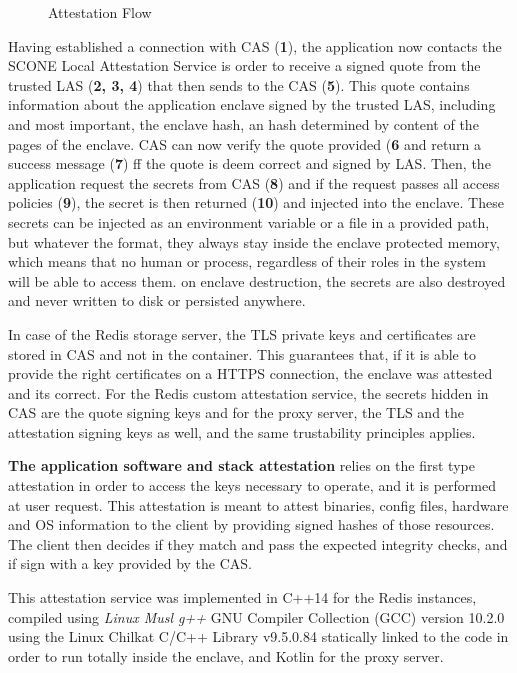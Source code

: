 \begin{figure}[htbp]
  \caption{Attestation Flow}
  \label{fig:attestation_flow}
\end{figure}

Having established a connection with \gls{CAS} (\textbf{1}), the application now contacts the SCONE Local Attestation Service is order to receive a signed quote from the trusted \gls{LAS} (\textbf{2, 3, 4}) that then sends to the \gls{CAS} (\textbf{5}). This quote contains information about the application enclave signed by the trusted \gls{LAS}, including and most important, the enclave hash, an hash determined by content of the pages of the enclave. \gls{CAS} can now verify the quote provided (\textbf{6} and return a success message (\textbf{7}) ff the quote is deem correct and signed by \gls{LAS}. Then, the application request the secrets from \gls{CAS} (\textbf{8}) and if the request passes all access policies (\textbf{9}), the secret is then returned (\textbf{10}) and injected into the enclave. These secrets can be injected as an environment variable or a file in a provided path, but whatever the format, they always stay inside the enclave protected memory, which means that no human or process, regardless of their roles in the system will be able to access them. on enclave destruction, the secrets are also destroyed and never written to disk or persisted anywhere. 

In case of the Redis storage server, the \gls{TLS} private keys and certificates are stored in \gls{CAS} and not in the container. This guarantees that, if it is able to provide the right certificates on a \gls{HTTPS} connection, the enclave was attested and its correct. For the Redis custom attestation service, the secrets hidden in \gls{CAS} are the quote signing keys and for the proxy server, the \gls{TLS} and the attestation signing keys as well, and the same trustability principles applies.

\textbf{The application software and stack attestation} relies on the first type attestation in order to access the keys necessary to operate, and it is performed at user request. This attestation is meant to attest binaries, config files, hardware and \gls{OS} information to the client by providing signed hashes of those resources. The client then decides if they match and pass the expected integrity checks, and if sign with a key provided by the \gls{CAS}.

This attestation service was implemented in C++14 for the Redis instances, compiled using \textit{Linux Musl g++} GNU Compiler Collection (GCC) version 10.2.0 using the Linux Chilkat C/C++ Library v9.5.0.84 statically linked to the code in order to run totally inside the enclave, and Kotlin for the proxy server.

